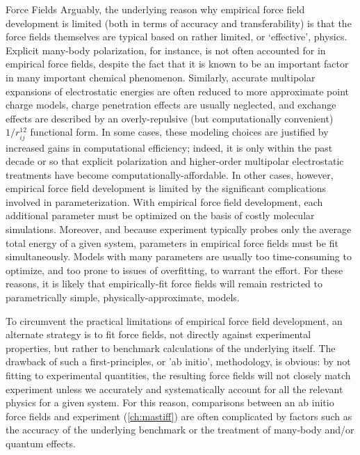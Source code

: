 \begin{section}{Force Fields}
Arguably, the underlying reason why empirical force field development is
limited (both in terms of accuracy and transferability) is that the
force fields themselves are typical based on rather limited, or `effective',
physics.
\cite{Parker2015,Sherrill2009,Zgarbova2010}
Explicit many-body polarization, for instance, is not often accounted for in
empirical force fields, despite the fact that it is known to be an important
factor in many important chemical phenomenon.
\cite{Cisneros2016a,Freddolino2010,Cieplak2009}
Similarly, accurate multipolar expansions of electrostatic energies are often
reduced to more approximate point charge models,\cite{Cardamone2014} 
charge penetration effects are usually neglected,
\cite{Parker2015,Sherrill2009}
and exchange effects are described by an overly-repulsive (but computationally
convenient) $1/r_{ij}^{12}$ functional form.
\cite{Abrahamson1963,Mackerell2004,Parker2015,Sherrill2009,Zgarbova2010}
In some cases, these modeling choices are justified by increased gains in
computational efficiency; indeed, it is only within the past decade or so that
explicit polarization and higher-order multipolar electrostatic
treatments have become computationally-affordable.
\cite{Albaugh2016,Cardamone2014,Cieplak2009,Simmonett2015,Simmonett2016,Demerdash2014}
In other cases, however, empirical force field development is limited by the
significant complications involved in parameterization.
With empirical force field development, each additional parameter must be
optimized on the basis of costly molecular simulations.
Moreover, and because experiment typically probes 
only the average total energy of a given system, parameters in empirical
force fields must be fit simultaneously. Models with many parameters are
usually too time-consuming to optimize, and too prone to issues of
overfitting,\cite{Hawkins2004} to warrant the effort. For these reasons, it is
likely that empirically-fit force fields will remain restricted to
parametrically simple, physically-approximate, models.

To circumvent the practical limitations of empirical force field development,
an alternate strategy is to fit force fields, not directly against
experimental properties, but rather to benchmark calculations of the
underlying \pes itself.\cite{Stone2007} 
The drawback of such a first-principles, or 'ab initio', methodology, is
obvious: by not fitting to experimental quantities, 
the resulting force fields will not closely match experiment unless we
accurately and systematically account for all the relevant physics for a given
system.
For this reason, comparisons between an ab initio force fields and experiment (\cref{ch:mastiff})
are often complicated by factors such as
the accuracy of the underlying
benchmark \pes or the treatment of many-body and/or quantum effects.
\cite{Johnson2009,Taylor2016,Chalasinski2000}


\end{section}
